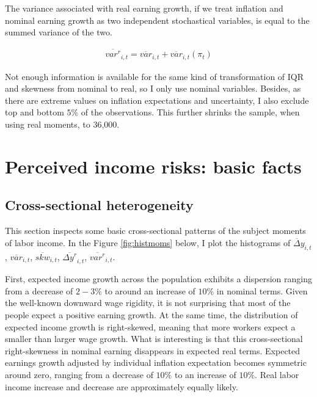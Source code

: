 \documentclass[12pt,notitlepage,onecolumn,aps,pra]{article}
\begin{document}
The variance associated with real earning growth, if we treat inflation
and nominal earning growth as two independent stochastical variables, is
equal to the summed variance of the two.

\begin{eqnarray}
\overline{var^{r}}_{i,t} = \overline{var}_{i,t} + \overline{var}_{i,t}(\pi_{t})
\end{eqnarray}

Not enough information is available for the same kind of transformation
of IQR and skewness from nominal to real, so I only use nominal
variables. Besides, as there are extreme values on inflation
expectations and uncertainty, I also exclude top and bottom \(5\%\) of
the observations. This further shrinks the sample, when using real
moments, to 36,000.

    \hypertarget{perceived-income-risks-basic-facts}{%
\section{Perceived income risks: basic
facts}\label{perceived-income-risks-basic-facts}}

\hypertarget{cross-sectional-heterogeneity}{%
\subsection{Cross-sectional
heterogeneity}\label{cross-sectional-heterogeneity}}

This section inspects some basic cross-sectional patterns of the subject
moments of labor income. In the Figure \ref{fig:histmoms} below, I plot
the histograms of \(\overline\Delta y_{i,t}\), \(\overline{var}_{i,t}\),
\(\overline {skw}_{i,t}\), \(\overline {\Delta y^{r}}_{i,t}\),
\(\overline{var^{r}}_{i,t}\).

First, expected income growth across the population exhibits a
dispersion ranging from a decrease of \(2-3\%\) to around an increase of
\(10\%\) in nominal terms. Given the well-known downward wage rigidity,
it is not surprising that most of the people expect a positive earning
growth. At the same time, the distribution of expected income growth is
right-skewed, meaning that more workers expect a smaller than larger
wage growth. What is interesting is that this cross-sectional
right-skewness in nominal earning disappears in expected real terms.
Expected earnings growth adjusted by individual inflation expectation
becomes symmetric around zero, ranging from a decrease of \(10\%\) to an
increase of \(10\%\). Real labor income increase and decrease are
approximately equally likely.
\end{document}
